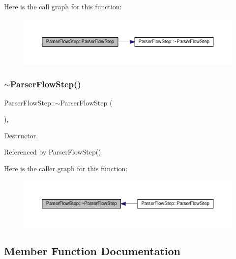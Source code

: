 Here is the call graph for this function\+:
\nopagebreak
\begin{figure}[H]
\begin{center}
\leavevmode
\includegraphics[width=350pt]{dd/d99/classParserFlowStep_a9b43a17358242fb4dfb54eb3d4091d96_cgraph}
\end{center}
\end{figure}
\mbox{\label{classParserFlowStep_abe1ae8ae35d1337ab7d8ed62cc5a47bf}} 
\subsubsection{\texorpdfstring{$\sim$\+Parser\+Flow\+Step()}{~ParserFlowStep()}}
{\footnotesize\ttfamily Parser\+Flow\+Step\+::$\sim$\+Parser\+Flow\+Step (\begin{DoxyParamCaption}{ }\end{DoxyParamCaption})\hspace{0.3cm}{\ttfamily [override]}, {\ttfamily [default]}}



Destructor. 



Referenced by Parser\+Flow\+Step().

Here is the caller graph for this function\+:
\nopagebreak
\begin{figure}[H]
\begin{center}
\leavevmode
\includegraphics[width=350pt]{dd/d99/classParserFlowStep_abe1ae8ae35d1337ab7d8ed62cc5a47bf_icgraph}
\end{center}
\end{figure}


\subsection{Member Function Documentation}
\mbox{\label{classParserFlowStep_a41edd2518ace1ab135ba83ca630540fa}} 
